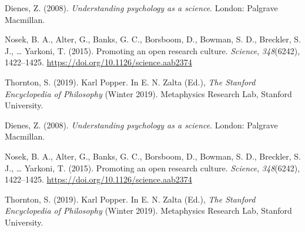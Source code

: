 \documentclass[
  english,
  man]{apa6}
\begin{document}
\begingroup
\setlength{\parindent}{-0.5in}
\setlength{\leftskip}{0.5in}

\hypertarget{refs}{}
\leavevmode\hypertarget{ref-dienesUnderstandingPsychologyScience2008}{}%
Dienes, Z. (2008). \emph{Understanding psychology as a science}. London: Palgrave Macmillan.

\leavevmode\hypertarget{ref-Nosek2015}{}%
Nosek, B. A., Alter, G., Banks, G. C., Borsboom, D., Bowman, S. D., Breckler, S. J., \ldots{} Yarkoni, T. (2015). Promoting an open research culture. \emph{Science}, \emph{348}(6242), 1422--1425. \url{https://doi.org/10.1126/science.aab2374}

\leavevmode\hypertarget{ref-thorntonKarlPopper2019}{}%
Thornton, S. (2019). Karl Popper. In E. N. Zalta (Ed.), \emph{The Stanford Encyclopedia of Philosophy} (Winter 2019). Metaphysics Research Lab, Stanford University.

\leavevmode\hypertarget{ref-dienesUnderstandingPsychologyScience2008}{}%
Dienes, Z. (2008). \emph{Understanding psychology as a science}. London: Palgrave Macmillan.

\leavevmode\hypertarget{ref-Nosek2015}{}%
Nosek, B. A., Alter, G., Banks, G. C., Borsboom, D., Bowman, S. D., Breckler, S. J., \ldots{} Yarkoni, T. (2015). Promoting an open research culture. \emph{Science}, \emph{348}(6242), 1422--1425. \url{https://doi.org/10.1126/science.aab2374}

\leavevmode\hypertarget{ref-thorntonKarlPopper2019}{}%
Thornton, S. (2019). Karl Popper. In E. N. Zalta (Ed.), \emph{The Stanford Encyclopedia of Philosophy} (Winter 2019). Metaphysics Research Lab, Stanford University.

\endgroup
\end{document}
